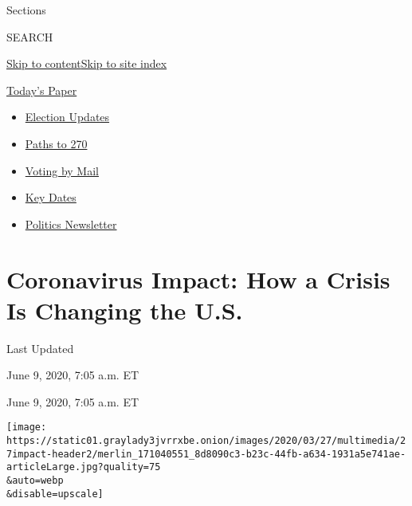 Sections

SEARCH

\protect\hyperlink{site-content}{Skip to
content}\protect\hyperlink{site-index}{Skip to site index}

\href{https://myaccount.nytimes3xbfgragh.onion/auth/login?response_type=cookie\&client_id=vi}{}

\href{https://www.nytimes3xbfgragh.onion/section/todayspaper}{Today's
Paper}

\begin{itemize}
\item
  \href{https://www.nytimes3xbfgragh.onion/live/2020/09/08/us/trump-vs-biden?action=click\&pgtype=Article\&state=default\&region=TOP_BANNER\&context=storylines_menu}{Election
  Updates}
\item
  \href{https://www.nytimes3xbfgragh.onion/interactive/2020/us/elections/election-states-biden-trump.html?action=click\&pgtype=Article\&state=default\&region=TOP_BANNER\&context=storylines_menu}{Paths
  to 270}
\item
  \href{https://www.nytimes3xbfgragh.onion/interactive/2020/08/31/us/politics/vote-by-mail-deadlines.html?action=click\&pgtype=Article\&state=default\&region=TOP_BANNER\&context=storylines_menu}{Voting
  by Mail}
\item
  \href{https://www.nytimes3xbfgragh.onion/interactive/2019/us/elections/2020-presidential-election-calendar.html?action=click\&pgtype=Article\&state=default\&region=TOP_BANNER\&context=storylines_menu}{Key
  Dates}
\item
  \href{https://www.nytimes3xbfgragh.onion/newsletters/politics?action=click\&pgtype=Article\&state=default\&region=TOP_BANNER\&context=storylines_menu}{Politics
  Newsletter}
\end{itemize}

\hypertarget{coronavirus-impact-how-a-crisis-is-changing-the-us}{%
\section{Coronavirus Impact: How a Crisis Is Changing the
U.S.}\label{coronavirus-impact-how-a-crisis-is-changing-the-us}}

Last Updated

June 9, 2020, 7:05 a.m. ET

June 9, 2020, 7:05 a.m. ET

\texttt{[image: https://static01.graylady3jvrrxbe.onion/images/2020/03/27/multimedia/27impact-header2/merlin\_171040551\_8d8090c3-b23c-44fb-a634-1931a5e741ae-articleLarge.jpg?quality=75\\\&auto=webp\\\&disable=upscale]}


